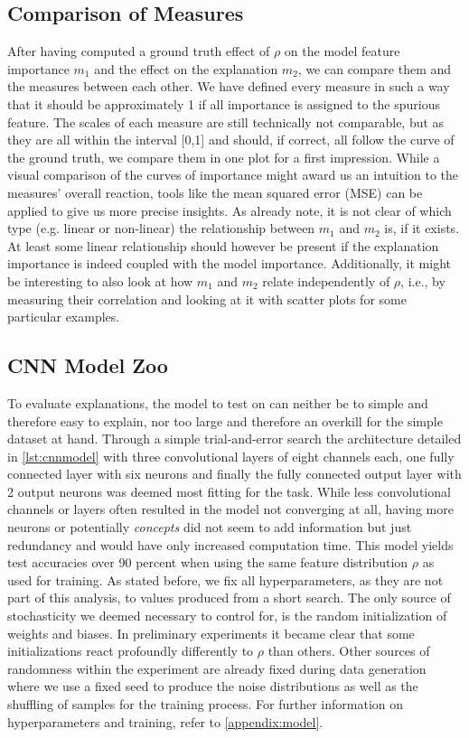 \subsection{Comparison of Measures}\label{section:experiment_setup}
After having computed a ground truth effect of $\rho$ on the model feature importance $m_1$ and the effect on the explanation $m_2$, we can compare them and the measures between each other.
We have defined every measure in such a way that it should be approximately 1 if all importance is assigned to the spurious feature. The scales of each measure are still technically not comparable, but as they are all within the interval [0,1] and should, if correct, all follow the curve of the ground truth, we compare them in one plot for a first impression.
While a visual comparison of the curves of importance might award us an intuition to the measures' overall reaction, tools like the mean squared error (MSE) can be applied to give us more precise insights. As \citet{Karimi2023} already note,
it is not clear of which type (e.g. linear or non-linear) the relationship between $m_1$ and $m_2$ is, if it exists. At least some linear relationship should however be present if the explanation importance is indeed coupled with the model importance.
Additionally, it might be interesting to also look at how $m_1$ and $m_2$ relate independently of $\rho$, i.e., by measuring their correlation and looking at it with scatter plots for some particular examples. 


\subsection{CNN Model Zoo}\label{section:model_zoo}
To evaluate explanations, the model to test on can neither be to simple and therefore easy to explain, nor too large and therefore an overkill for the simple dataset at hand.
Through a simple trial-and-error search the architecture detailed in \cref{lst:cnnmodel} with three convolutional layers of eight channels each, one fully connected layer with six neurons and finally the fully connected output layer with 2 output neurons was deemed most fitting for the task. While less convolutional channels or layers often resulted in the model not converging at all, having more neurons or potentially \textit{concepts} did not seem to add information but just redundancy and would have only increased computation time.
This model yields test accuracies over 90 percent when using the same feature distribution $\rho$ as used for training. As stated before, we fix all hyperparameters, as they are not part of this analysis, to values produced from a short search.
The only source of stochasticity we deemed necessary to control for, is the random initialization of weights and biases. In preliminary experiments it became clear that some initializations react profoundly differently to $\rho$ than others. Other sources of randomness within the experiment are already fixed during data generation where we use a fixed seed to produce the noise distributions as well as the shuffling of samples for the training process. 
For further information on hyperparameters and training, refer to \cref{appendix:model}.

